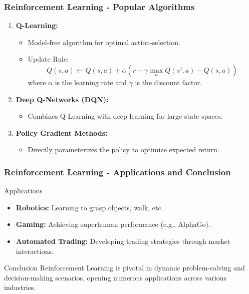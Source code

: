 \documentclass[aspectratio=169]{beamer}
\begin{document}
\begin{frame}[fragile]
    \frametitle{Reinforcement Learning - Popular Algorithms}
    \begin{enumerate}
        \item \textbf{Q-Learning:}
            \begin{itemize}
                \item Model-free algorithm for optimal action-selection.
                \item Update Rule:
                \begin{equation}
                    Q(s, a) \leftarrow Q(s, a) + \alpha (r + \gamma \max_a Q(s', a) - Q(s, a))
                \end{equation}
                where $\alpha$ is the learning rate and $\gamma$ is the discount factor.
            \end{itemize}

        \item \textbf{Deep Q-Networks (DQN):}
            \begin{itemize}
                \item Combines Q-Learning with deep learning for large state spaces.
            \end{itemize}

        \item \textbf{Policy Gradient Methods:}
            \begin{itemize}
                \item Directly parameterizes the policy to optimize expected return.
            \end{itemize}
    \end{enumerate}
\end{frame}

\begin{frame}[fragile]
    \frametitle{Reinforcement Learning - Applications and Conclusion}
    \begin{block}{Applications}
        \begin{itemize}
            \item \textbf{Robotics:} Learning to grasp objects, walk, etc.
            \item \textbf{Gaming:} Achieving superhuman performance (e.g., AlphaGo).
            \item \textbf{Automated Trading:} Developing trading strategies through market interactions.
        \end{itemize}
    \end{block}

    \begin{block}{Conclusion}
        Reinforcement Learning is pivotal in dynamic problem-solving and decision-making scenarios, opening numerous applications across various industries.
    \end{block}
\end{frame}
\end{document}
